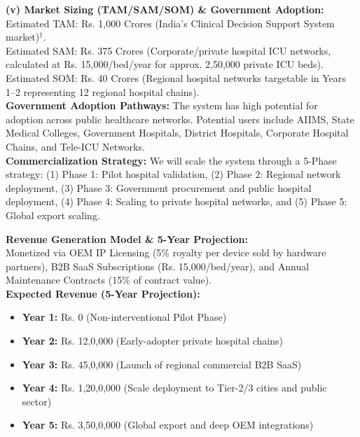 \documentclass[11pt, a4paper]{article}
\begin{document}
\textbf{(v) Market Sizing (TAM/SAM/SOM) \& Government Adoption:}\\
Estimated TAM: Rs. 1,000 Crores (India's Clinical Decision Support System market)$^\dagger$.\\
Estimated SAM: Rs. 375 Crores (Corporate/private hospital ICU networks, calculated at Rs. 15,000/bed/year for approx. 2,50,000 private ICU beds).\\
Estimated SOM: Rs. 40 Crores (Regional hospital networks targetable in Years 1--2 representing 12 regional hospital chains).\\
\textbf{Government Adoption Pathways:} The system has high potential for adoption across public healthcare networks. Potential users include AIIMS, State Medical Colleges, Government Hospitals, District Hospitals, Corporate Hospital Chains, and Tele-ICU Networks.\\
\textbf{Commercialization Strategy:} We will scale the system through a 5-Phase strategy: (1) Phase 1: Pilot hospital validation, (2) Phase 2: Regional network deployment, (3) Phase 3: Government procurement and public hospital deployment, (4) Phase 4: Scaling to private hospital networks, and (5) Phase 5: Global export scaling.

\vspace{0.2cm}
\textbf{Revenue Generation Model \& 5-Year Projection:}\\
Monetized via OEM IP Licensing (5\% royalty per device sold by hardware partners), B2B SaaS Subscriptions (Rs. 15,000/bed/year), and Annual Maintenance Contracts (15\% of contract value).\\[0.1cm]
\textbf{Expected Revenue (5-Year Projection):}
\begin{itemize}
    \item \textbf{Year 1:} Rs. 0 (Non-interventional Pilot Phase)
    \item \textbf{Year 2:} Rs. 12,0,000 (Early-adopter private hospital chains)
    \item \textbf{Year 3:} Rs. 45,0,000 (Launch of regional commercial B2B SaaS)
    \item \textbf{Year 4:} Rs. 1,20,0,000 (Scale deployment to Tier-2/3 cities and public sector)
    \item \textbf{Year 5:} Rs. 3,50,0,000 (Global export and deep OEM integrations)
\end{itemize}
\end{document}
